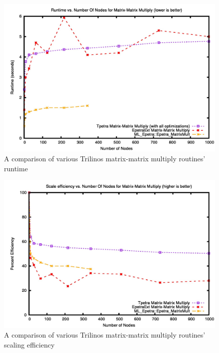 \documentclass{article}
\begin{document}
\begin{figure}
\includegraphics[scale=.4]{totaltime.jpg}
\caption[Time Comparison]{A comparison of various Trilinos matrix-matrix multiply routines' runtime}
\label{totaltime}
\end{figure}

\begin{figure}
\includegraphics[scale=.4]{totaleff.jpg}
\caption[Efficiency Comparison]{A comparison of various Trilinos matrix-matrix multiply routines' scaling efficiency}
\label{totaleff}
\end{figure}
\end{document}
